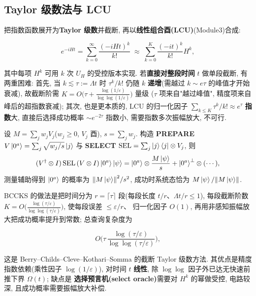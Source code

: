 \documentclass[utf8]{article} %
\numberwithin{equation}{section}   %
\newtheorem{Note}{\hskip 2em {\color{red} 注}}[subsection]
\begin{document}
\subsection{Taylor 级数法与 LCU}

把指数函数展开为\textbf{Taylor 级数}并截断, 再以\textbf{线性组合酉(LCU)}(Module3)合成:

\begin{equation}
    e^{-iHt} = \sum_{k=0}^{\infty} \frac{(-iHt)^k}{k!}
    \;\approx\; \sum_{k=0}^{K} \frac{(-it)^k}{k!} H^k,
\end{equation}

其中每项 $H^k$ 可用 $k$ 次 $U_H$ 的受控版本实现. 若\textbf{直接对整段时间} $t$ 做单段截断, 有两重困难:
首先, 当 $k \lesssim \tau := \Lambda t$ 时 $\tau^k/k!$ 仍随 $k$ \textbf{递增}(需越过 $k \sim e\tau$ 的峰值才开始衰减),
故截断阶需 $K = O\!\big(\tau + \frac{\log(1/\varepsilon)}{\log\log(1/\varepsilon)}\big)$ 量级
($\tau$ 项来自"越过峰值", 精度项来自峰后的超指数衰减);
其次, 也是更本质的, LCU 的归一化因子 $\sum_{k\le K}\tau^k/k! \approx e^{\tau}$ \textbf{指数}大,
直接后选择成功概率 $\sim e^{-2\tau}$ 指数小, 需要指数多次振幅放大, 不可行.

\begin{Note}
    设 $M = \sum_j w_j V_j$($w_j \ge 0$, $V_j$ 酉), $s = \sum_j w_j$.
    构造 \textbf{PREPARE} $V\ket{0^a} = \sum_j\sqrt{w_j/s}\ket j$ 与
    \textbf{SELECT} $\mathrm{SEL} = \sum_j\ket j\bra j\otimes V_j$, 则
    \begin{equation}
        (V^\dagger\otimes I)\,\mathrm{SEL}\,(V\otimes I)\ket{0^a}\ket\psi
        = \ket{0^a}\otimes\frac{M\ket\psi}{s} + \ket{0^a}^{\perp}\otimes(\cdots),
    \end{equation}
    测量辅助得到 $\ket{0^a}$ 的概率为 $\norm{M\ket\psi}^2/s^2$,
    成功时系统态恰为 $M\ket\psi/\norm{M\ket\psi}$.
\end{Note}

BCCKS 的做法是把时间分为
$r = \lceil\tau\rceil$ 段(每段长度 $t/r$、$\Lambda t/r \le 1$), 每段截断阶数
$K = O\!\big(\frac{\log(\tau/\varepsilon)}{\log\log(\tau/\varepsilon)}\big)$, 使每段误差 $\le\varepsilon/r$、
归一化因子 $O(1)$, 再用非感知振幅放大把成功概率提升到常数; 总查询复杂度为

\begin{equation}
    O\!\Big(\tau\, \frac{\log(\tau/\varepsilon)}{\log\log(\tau/\varepsilon)}\Big),
\end{equation}

这是 Berry--Childs--Cleve--Kothari--Somma 的截断 Taylor 级数方法.
其优点是精度指数依赖(乘性因子 $\log(1/\varepsilon)$), 对时间 $t$ \textbf{线性},
除 $\log\log$ 因子外已达无快速前推下界 $\Omega(t)$;
缺点是 \textbf{选择预言机(select oracle)}需要对 $H^k$ 的幂做受控, 电路较深,
且成功概率需要振幅放大补偿.
\end{document}
